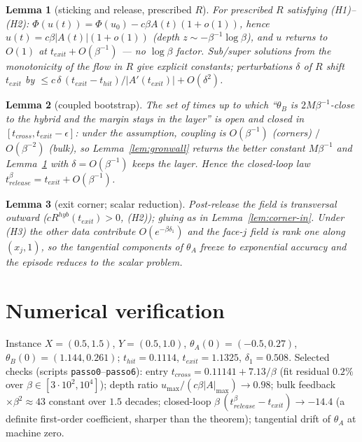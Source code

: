 \documentclass[11pt]{article}
\newtheorem{lemma}{Lemma}
\begin{document}
\begin{lemma}[sticking and release, prescribed $R$]\label{lem:release}
For prescribed $R$ satisfying (H1)--(H2): $\Phi(u(t))=\Phi(u_0)-c\beta A(t)(1+o(1))$,
hence $u(t)=c\beta|A(t)|(1+o(1))$ (depth $z\sim-\beta^{-1}\log\beta$), and $u$
returns to $O(1)$ at $t_{exit}+O(\beta^{-1})$ --- no $\log\beta$ factor. Sub/super
solutions from the monotonicity of the flow in $R$ give explicit constants;
perturbations $\delta$ of $R$ shift $t_{exit}$ by
$\le c\,\delta\,(t_{exit}-t_{hit})/|A'(t_{exit})|+O(\delta^2)$.
\end{lemma}

\begin{lemma}[coupled bootstrap]\label{lem:bootstrap}
The set of times up to which ``$\theta_B$ is $2M\beta^{-1}$-close to the hybrid
and the margin stays in the layer'' is open and closed in
$[t_{cross},t_{exit}-\epsilon]$: under the assumption, coupling is
$O(\beta^{-1})$ (corners) $/$ $O(\beta^{-2})$ (bulk), so
Lemma~\ref{lem:gronwall} returns the better constant $M\beta^{-1}$ and
Lemma~\ref{lem:release} with $\delta=O(\beta^{-1})$ keeps the layer. Hence the
closed-loop law $t^\beta_{release}=t_{exit}+O(\beta^{-1})$.
\end{lemma}

\begin{lemma}[exit corner; scalar reduction]\label{lem:corner-out}
Post-release the field is transversal outward ($cR^{hyb}(t_{exit})>0$, (H2));
gluing as in Lemma~\ref{lem:corner-in}. Under (H3) the other data contribute
$O(e^{-\beta\delta_1})$ and the face-$j$ field is rank one along $(x_j,1)$, so
the tangential components of $\theta_A$ freeze to exponential accuracy and the
episode reduces to the scalar problem.
\end{lemma}

\section{Numerical verification}\label{sec:num}
Instance $X=(0.5,1.5)$, $Y=(0.5,1.0)$, $\theta_A(0)=(-0.5,0.27)$,
$\theta_B(0)=(1.144,0.261)$; $t_{hit}=0.1114$, $t_{exit}=1.1325$,
$\delta_1=0.508$. Selected checks (scripts \texttt{passo0}--\texttt{passo6}):
entry $t_{cross}=0.11141+7.13/\beta$ (fit residual $0.2\%$ over
$\beta\in[3\cdot10^2,10^4]$); depth ratio $u_{\max}/(c\beta|A|_{\max})\to0.98$;
bulk feedback $\times\beta^2\approx43$ constant over $1.5$ decades; closed-loop
$\beta\,(t^\beta_{release}-t_{exit})\to-14.4$ (a definite first-order
coefficient, sharper than the theorem); tangential drift of $\theta_A$ at
machine zero.
\end{document}
